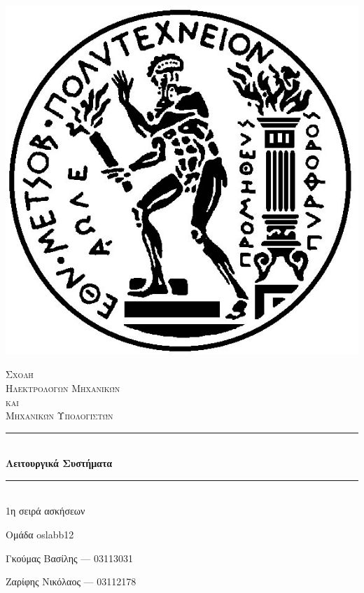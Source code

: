 \documentclass[12pt]{article}
\newcommand{\HRule}{\rule{\linewidth}{0.5mm}}
\begin{document}
\begin{titlepage}
\centering

\includegraphics[scale=0.3]{pyrforos.jpg}

\textsc{\LARGE Σχολή \\ Ηλεκτρολόγων Μηχανικών \\[-3pt] και \\[6pt] Μηχανικών Υπολογιστών}

\vspace{1cm}

\HRule \\[0.4cm]
{\huge \bfseries Λειτουργικά Συστήματα\\} %

\vspace{0.4cm}
\HRule \\[0.4cm]

\Large{1η σειρά ασκήσεων}



\vfill
\begin{center}
\large

Ομάδα \textlatin{oslabb12} 

Γκούμας Βασίλης ---  03113031 

Ζαρίφης Νικόλαος --- 03112178

\end{center}

\end{titlepage}
\end{document}
